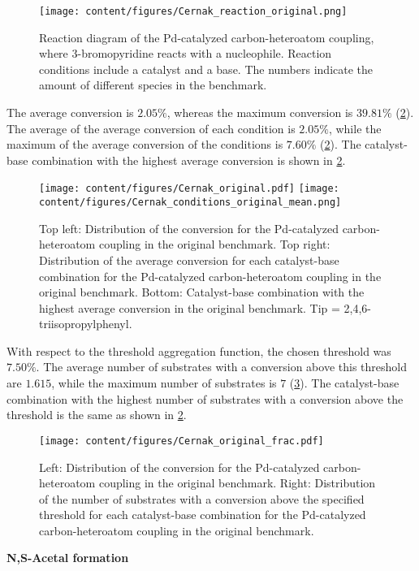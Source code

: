 \begin{figure}[h]
    \centering
    \texttt{[image: content/figures/Cernak\_reaction\_original.png]}
    \caption{Reaction diagram of the Pd-catalyzed carbon-heteroatom coupling, where 3-bromopyridine reacts with a nucleophile. Reaction conditions include a catalyst and a base. The numbers indicate the amount of different species in the benchmark.}
    \label{fig:Cernak_reaction}
\end{figure}

The average conversion is $2.05\%$, whereas the maximum conversion is $39.81\%$ (\cref{fig:Cernak_EDA}).
The average of the average conversion of each condition is $2.05\%$, while the maximum of the average conversion of the conditions is $7.60\%$ (\cref{fig:Cernak_EDA}).
The catalyst-base combination with the highest average conversion is shown in \cref{fig:Cernak_EDA}.

\begin{figure}[htb]
    \centering
    \texttt{[image: content/figures/Cernak\_original.pdf]}
    \texttt{[image: content/figures/Cernak\_conditions\_original\_mean.png]}
    \caption{Top left: Distribution of the conversion for the Pd-catalyzed carbon-heteroatom coupling in the original benchmark. Top right: Distribution of the average conversion for each catalyst-base combination for the Pd-catalyzed carbon-heteroatom coupling in the original benchmark. Bottom: Catalyst-base combination with the highest average conversion in the original benchmark. Tip = 2,4,6-triisopropylphenyl.}
    \label{fig:Cernak_EDA}
\end{figure}

With respect to the threshold aggregation function, the chosen threshold was $7.50\%$.
The average number of substrates with a conversion above this threshold are $1.615$, while the maximum number of substrates is $7$ (\cref{fig:Cernak_EDA_frac}).
The catalyst-base combination with the highest number of substrates with a conversion above the threshold is the same as shown in \cref{fig:Cernak_EDA}.

\begin{figure}[htb]
    \centering
    \texttt{[image: content/figures/Cernak\_original\_frac.pdf]}
    \caption{Left: Distribution of the conversion for the Pd-catalyzed carbon-heteroatom coupling in the original benchmark. Right: Distribution of the number of substrates with a conversion above the specified threshold for each catalyst-base combination for the Pd-catalyzed carbon-heteroatom coupling in the original benchmark.}
    \label{fig:Cernak_EDA_frac}
\end{figure}
\newpage
\textbf{N,S-Acetal formation}

